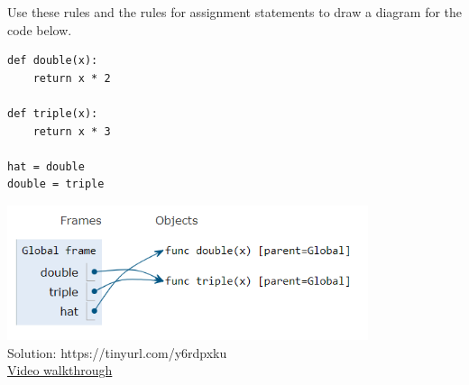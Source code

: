 \question Use these rules and the rules for assignment statements to draw a
diagram for the code below.

\begin{lstlisting}
def double(x):
    return x * 2

def triple(x):
    return x * 3

hat = double
double = triple
\end{lstlisting}

\begin{solution}
\includegraphics[width=300pt]{def-statements.png} \\
Solution: https://tinyurl.com/y6rdpxku \\
\href{https://youtu.be/rhXyTx-NkfE?t=3m28s}{Video walkthrough}
\end{solution}
